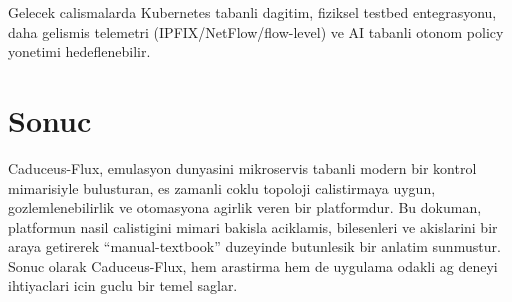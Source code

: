 \documentclass[conference]{IEEEtran}
\begin{document}
Gelecek calismalarda Kubernetes tabanli dagitim, fiziksel testbed entegrasyonu, daha gelismis telemetri (IPFIX/NetFlow/flow-level) ve AI tabanli otonom policy yonetimi hedeflenebilir.

\section{Sonuc}
Caduceus-Flux, emulasyon dunyasini mikroservis tabanli modern bir kontrol mimarisiyle bulusturan, es zamanli coklu topoloji calistirmaya uygun, gozlemlenebilirlik ve otomasyona agirlik veren bir platformdur. Bu dokuman, platformun nasil calistigini mimari bakisla aciklamis, bilesenleri ve akislarini bir araya getirerek ``manual-textbook'' duzeyinde butunlesik bir anlatim sunmustur. Sonuc olarak Caduceus-Flux, hem arastirma hem de uygulama odakli ag deneyi ihtiyaclari icin guclu bir temel saglar.
\end{document}
